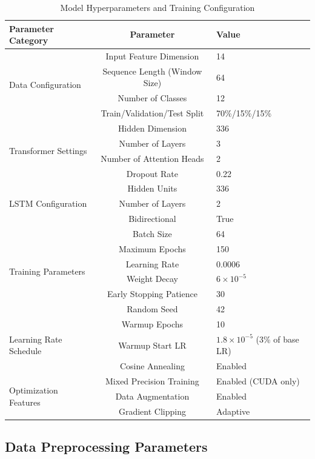 \begin{table}[htbp]
\centering
\caption{Model Hyperparameters and Training Configuration}
\label{tab:hyperparameters}
\begin{tabular}{|l|c|l|}
\hline
\textbf{Parameter Category} & \textbf{Parameter} & \textbf{Value} \\
\hline
\multirow{4}{*}{Data Configuration} & Input Feature Dimension & 14 \\
 & Sequence Length (Window Size) & 64 \\
 & Number of Classes & 12 \\
 & Train/Validation/Test Split & 70\%/15\%/15\% \\
\hline
\multirow{4}{*}{Transformer Settings} & Hidden Dimension & 336 \\
 & Number of Layers & 3 \\
 & Number of Attention Heads & 2 \\
 & Dropout Rate & 0.22 \\
\hline
\multirow{3}{*}{LSTM Configuration} & Hidden Units & 336 \\
 & Number of Layers & 2 \\
 & Bidirectional & True \\
\hline
\multirow{6}{*}{Training Parameters} & Batch Size & 64 \\
 & Maximum Epochs & 150 \\
 & Learning Rate & 0.0006 \\
 & Weight Decay & $6 \times 10^{-5}$ \\
 & Early Stopping Patience & 30 \\
 & Random Seed & 42 \\
\hline
\multirow{3}{*}{Learning Rate Schedule} & Warmup Epochs & 10 \\
 & Warmup Start LR & $1.8 \times 10^{-5}$ (3\% of base LR) \\
 & Cosine Annealing & Enabled \\
\hline
\multirow{3}{*}{Optimization Features} & Mixed Precision Training & Enabled (CUDA only) \\
 & Data Augmentation & Enabled \\
 & Gradient Clipping & Adaptive \\
\hline
\end{tabular}
\end{table}

\subsection{Data Preprocessing Parameters}
\label{subsec:preprocessing_parameters}

